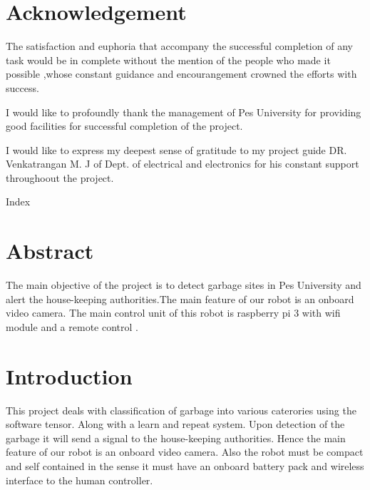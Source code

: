 \documentclass[a4paper,12pt]{article}
\begin{document}
\section{Acknowledgement}
{
The satisfaction and euphoria that accompany the successful completion of any task would be in complete without the mention of the people who made it possible ,whose constant guidance and encourangement crowned the efforts with success.

I would like to profoundly thank the management of Pes University for providing good facilities  for successful completion of the project.

I would like to express my deepest sense of gratitude to my project guide DR. Venkatrangan M. J of Dept. of electrical and electronics  for his constant support throughoout the project.

 
}
\newpage
\tableofcontents


Index
\section{Abstract}
 {
The main objective of the project is to detect garbage sites in Pes University and alert the house-keeping authorities.The main feature of our robot is an onboard video camera.
The main control unit of this robot is raspberry pi 3 with wifi module and a remote control .

 }
\section{Introduction}
This project deals with classification of garbage into various caterories using the software tensor.
Along with a learn and repeat system. Upon detection of the garbage it will send a signal to the house-keeping authorities. Hence the main feature of our robot is an onboard video camera. Also the robot must be compact and self contained in the sense it must have an onboard battery pack and wireless interface to the human controller.
\end{document}
